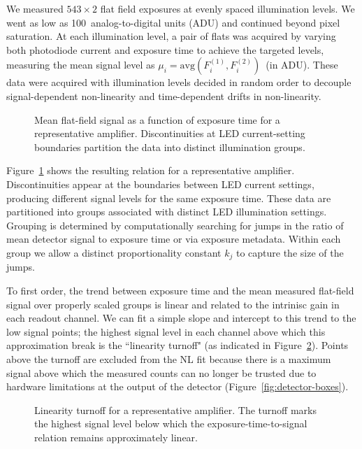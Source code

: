 We measured $543\times2$ flat field exposures at evenly spaced illumination levels. We went as low as 100~analog-to-digital units (ADU) and continued beyond pixel saturation.
At each illumination level, a pair of flats was acquired by varying both photodiode current and exposure time to achieve the targeted levels, measuring the mean signal level as $\mu_i = \mathrm{avg}(F_i^{(1)},F_i^{(2)})$~(in ADU).
These data were acquired with illumination levels decided in random order to decouple signal-dependent non-linearity and time-dependent drifts in non-linearity.

\begin{figure}[t]
    \centering
    \caption{Mean flat-field signal as a function of exposure time for a representative amplifier.
    Discontinuities at LED current-setting boundaries partition the data into distinct illumination groups.}
    \label{fig:linearity-exptime-vs-signal}
\end{figure}

Figure~\ref{fig:linearity-exptime-vs-signal} shows the resulting relation for a representative amplifier.
Discontinuities appear at the boundaries between LED current settings, producing different signal levels for the same exposure time.
These data are partitioned into groups associated with distinct LED illumination settings.
Grouping is determined by computationally searching for jumps in the ratio of mean detector signal to exposure time or via exposure metadata.
Within each group we allow a distinct proportionality constant $k_j$ to capture the size of the jumps.

To first order, the trend between exposure time and the mean measured flat-field signal over properly scaled groups is linear and related to the intrinisc gain in each readout channel.
We can fit a simple slope and intercept to this trend to the low signal points; the highest signal level in each channel above which this approximation break is the ``linearity turnoff" (as indicated in Figure~\ref{fig:linearity-turnoff}).
Points above the turnoff are excluded from the NL fit because there is a maximum signal above which the measured counts can no longer be trusted due to hardware limitations at the output of the detector (Figure~\ref{fig:detector-boxes}).

\begin{figure}[t]
    \centering
    \caption{Linearity turnoff for a representative amplifier.
    The turnoff marks the highest signal level below which the exposure-time-to-signal relation remains approximately linear.}
    \label{fig:linearity-turnoff}
\end{figure}

